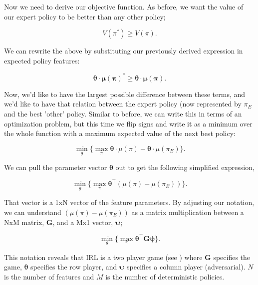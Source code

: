 \documentclass[11pt]{article}
\DeclareMathOperator*{\minimize}{min}
\DeclareMathOperator*{\maximize}{max}
\begin{document}
Now we need to derive our objective function. As before, we want the value of our expert policy to be better than any other policy;

\begin{equation}
    V(\pi^*) \geq V(\pi).
\end{equation}

We can rewrite the above by substituting our previously derived expression in expected policy features:

\begin{equation}
    \boldsymbol{\theta} \cdot \boldsymbol{\mu(\pi)^*} \geq \boldsymbol{\theta} \cdot \boldsymbol{\mu(\pi)}.
\end{equation}

Now, we'd like to have the largest possible difference between these terms, and we'd like to have that relation between the expert policy (now represented by $\pi_E$ and the best 'other' policy. Similar to before, we can write this in terms of an optimization problem, but this time we flip signs and write it as a minimum over the whole function with a maximum expected value of the next best policy:

\begin{equation}
    \minimize_{\theta}\{\maximize_{\pi} \boldsymbol{\theta} \cdot \mu(\pi) - \boldsymbol{\theta} \cdot \mu(\pi_E)\}.
\end{equation}

We can pull the parameter vector $\boldsymbol{\theta}$ out to get the following simplified expression, 

\begin{equation}
    \minimize_{\theta}\{\maximize_{\pi} \boldsymbol{\theta^{\top}} (\mu(\pi) - \mu(\pi_E))\}.
\end{equation}

That vector is a 1xN vector of the feature parameters. By adjusting our notation, we can understand $(\mu(\pi) - \mu(\pi_E))$ as a matrix multiplication between a NxM matrix, $\boldsymbol{G}$, and a Mx1 vector, $\boldsymbol{\psi}$;

\begin{equation}
    \minimize_{\theta}\{\maximize_{\pi} \boldsymbol{\theta^{\top}} \boldsymbol{G} \boldsymbol{\psi}\}.
\end{equation}

This notation reveals that IRL is a two player game (see \cite{von2007theory}) where $\boldsymbol{G}$ specifies the game, $\boldsymbol{\theta}$ specifies the row player, and $\boldsymbol{\psi}$ specifies a column player (adversarial). $N$ is the number of features and $M$ is the number of deterministic policies. \\
\end{document}
